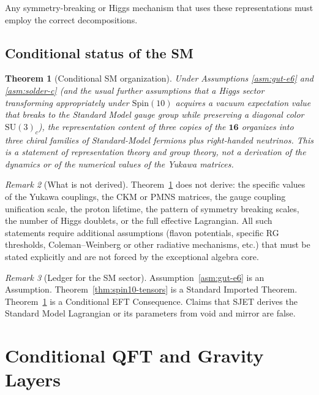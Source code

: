 \documentclass[11pt]{article}
\theoremstyle{plain}
\newtheorem{theorem}{Theorem}[section]
\theoremstyle{definition}
\theoremstyle{remark}
\newtheorem{remark}[theorem]{Remark}
\numberwithin{equation}{section}
\newcommand{\Spin}{\mathrm{Spin}}
\begin{document}
Any symmetry-breaking or Higgs mechanism that uses these representations must employ the correct decompositions.

\subsection{Conditional status of the SM}

\begin{theorem}[Conditional SM organization]\label{thm:sm-cond}
Under Assumptions \ref{asm:gut-e6} and \ref{asm:solder-c} (and the usual further assumptions that a Higgs sector transforming appropriately under $\Spin(10)$ acquires a vacuum expectation value that breaks to the Standard Model gauge group while preserving a diagonal color $\mathrm{SU}(3)_c$), the representation content of three copies of the $\mathbf{16}$ organizes into three chiral families of Standard-Model fermions plus right-handed neutrinos. This is a statement of representation theory and group theory, not a derivation of the dynamics or of the numerical values of the Yukawa matrices.
\end{theorem}

\begin{remark}[What is not derived]
Theorem~\ref{thm:sm-cond} does not derive: the specific values of the Yukawa couplings, the CKM or PMNS matrices, the gauge coupling unification scale, the proton lifetime, the pattern of symmetry breaking scales, the number of Higgs doublets, or the full effective Lagrangian. All such statements require additional assumptions (flavon potentials, specific RG thresholds, Coleman--Weinberg or other radiative mechanisms, etc.) that must be stated explicitly and are not forced by the exceptional algebra core.
\end{remark}

\begin{remark}[Ledger for the SM sector]
Assumption~\ref{asm:gut-e6} is an Assumption. Theorem~\ref{thm:spin10-tensors} is a Standard Imported Theorem. Theorem~\ref{thm:sm-cond} is a Conditional EFT Consequence. Claims that SJET derives the Standard Model Lagrangian or its parameters from void and mirror are false.
\end{remark}

\section{Conditional QFT and Gravity Layers}
\label{sec:qft-grav}
\end{document}
